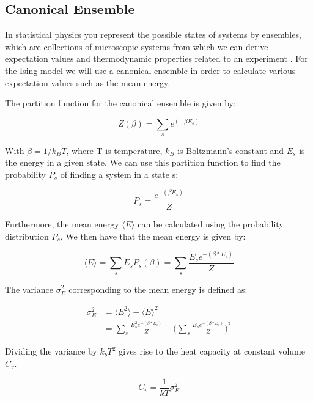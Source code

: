 \documentclass{article}
\begin{document}
\begin{multicols}{2}
\subsection*{Canonical Ensemble}
In statistical physics you represent the possible states of systems by ensembles, which are collections of microscopic systems from which we can derive expectation values and thermodynamic properties related to an experiment \cite{95}. For the Ising model we will use a canonical ensemble in order to calculate various expectation values such as the mean energy. 

The partition function for the canonical ensemble is given by:

\begin{equation}
Z(\beta) = \sum_{s} e^{(-\beta E_s)}
\label{eq:Z}
\end{equation}

With $\beta=1/k_BT$, where T is temperature, $k_B$ is Boltzmann's constant and $E_s$ is the energy in a given state. We can use this partition function to find the probability $P_s$ of finding a system in a state s:

\begin{equation}
P_s=\frac{e^{-(\beta E_s)}}{Z}
\label{eq:P_s}
\end{equation}

Furthermore, the mean energy $\langle E \rangle$ can be calculated using the probability distribution $P_s$, We then have that the mean energy  is given by:

\begin{equation}
\langle E \rangle = \sum_s E_s P_s(\beta)  = \sum_s \frac{E_s e^{-(\beta*E_s)}}{Z}
\label{eq:E_m}
\end{equation}

The variance $\sigma_E^2$ corresponding to the mean energy is defined as:

\begin{equation}
\begin{split}
\sigma_E^2 &= \langle E^2 \rangle - \langle E \rangle^2 \\
&= \sum_s \frac{E_s^2 e^{-(\beta*E_s)}}{Z} - \bigg(\sum_s \frac{E_s e^{-(\beta*E_s)}}{Z}\bigg)^2
\end{split}
\label{eq:E_v}
\end{equation}

Dividing the variance by $k_bT^2$ gives rise to the heat capacity at constant volume $C_v$.

\begin{equation}
C_v = \frac{1}{kT} \sigma_E^2 
\label{eq:C_v}
\end{equation}


\end{multicols}
\end{document}
